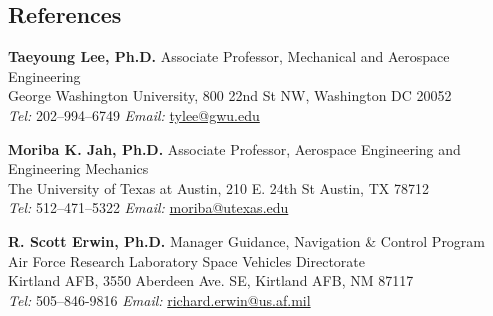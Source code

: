\subsection*{References}
{}

\textbf{Taeyoung Lee, Ph.D.}
Associate Professor, Mechanical and Aerospace Engineering\\
George Washington University, 800 22nd St NW, Washington DC 20052 \\
\textit{Tel:} 202--994--6749 \hspace{1cm} \textit{Email:} \href{mailto:tylee@gwu.edu}{tylee@gwu.edu}

\textbf{Moriba K. Jah, Ph.D.}
Associate Professor, Aerospace Engineering and Engineering Mechanics \\
The University of Texas at Austin, 210 E. 24th St Austin, TX 78712 \\
\textit{Tel:} 512--471--5322 \hspace{1cm} \textit{Email:} \href{mailto:moriba@utexas.edu}{moriba@utexas.edu}

\textbf{R. Scott Erwin, Ph.D.}
    Manager Guidance, Navigation \& Control Program\\
Air Force Research Laboratory Space Vehicles Directorate\\
Kirtland AFB, 3550 Aberdeen Ave. SE, Kirtland AFB, NM 87117\\
\textit{Tel:} 505--846-9816 \hspace{1cm} \textit{Email:} \href{mailto:richard.erwin@us.af.mil}{richard.erwin@us.af.mil}

